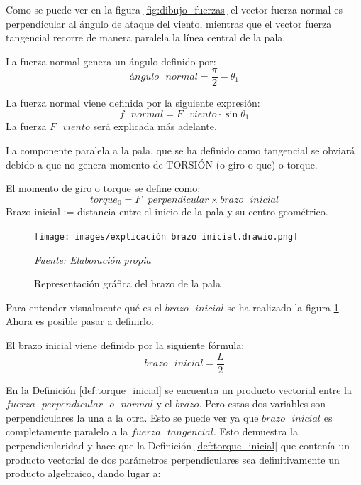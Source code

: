 Como se puede ver en la figura \ref{fig:dibujo_fuerzas} el vector fuerza normal es perpendicular al ángulo de ataque del viento, mientras que el vector fuerza tangencial recorre de manera paralela la línea central de la pala.

 \begin{definicion}
 La fuerza normal genera un ángulo definido por:
 $$ ángulo \text{ } normal = \dfrac{\pi}{2} - \theta_1 $$
 
 \end{definicion}

 \begin{definicion}
 La fuerza normal viene definida por la siguiente expresión:
  $$ f \text{ } normal = F \text{ } viento \cdot \sin{\theta_1}$$
   La fuerza $F \text{ } viento$ será explicada más adelante.
  \label{def:fuerza_normal_inicial}
 \end{definicion}
 
  La componente paralela a la pala, que se ha definido como tangencial se obviará debido a que no genera momento de TORSIÓN (o giro o que) o torque. 
  
  \begin{definicion}
El momento de giro o torque se define como:
 $$ torque_0 = F \text{ } perpendicular \times brazo \text{ } inicial$$
 \label{def:torque_inicial}
 Brazo inicial := distancia entre el inicio de la pala y su centro geométrico. \\
 \end{definicion}
 

     \textbf{}
    \begin{figure}[H]
    \centering
    \texttt{[image: images/explicación brazo inicial.drawio.png]}
    \caption{Representación gráfica del brazo de la pala}
    \label{fig:exp_brazo_inicial}
    \textit{Fuente: Elaboración propia}
\end{figure}
 

Para entender visualmente qué es el $brazo \text{ } inicial$ se ha realizado la figura \ref{fig:exp_brazo_inicial}. Ahora es posible pasar a definirlo.

\begin{definicion}
El  brazo inicial viene definido por la siguiente fórmula:
$$ brazo \text{ } inicial = \dfrac{L}{2}$$
\end{definicion}
 
 En la Definición \ref{def:torque_inicial} se encuentra un producto vectorial entre la $fuerza  \text{ }perpendicular \text{ } o \text{ } normal$ y el $brazo$. Pero estas dos variables son perpendiculares la una a la otra. Esto se puede ver ya que $brazo \text{ } inicial$ es completamente paralelo a la $fuerza \text{ } tangencial$. Esto demuestra la perpendicularidad y hace que la Definición \ref{def:torque_inicial} que contenía un producto vectorial de dos parámetros perpendiculares sea definitivamente un producto algebraico, dando lugar a:
 
